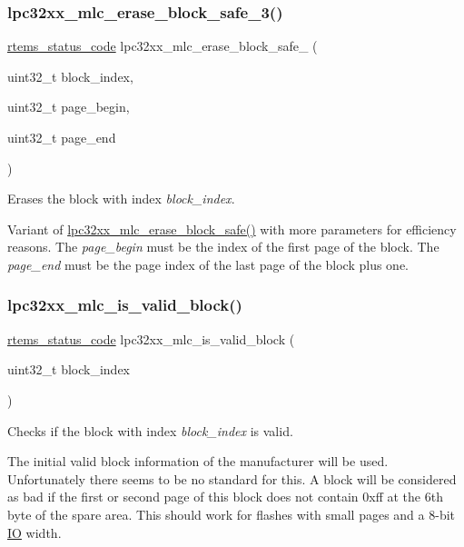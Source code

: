\subsubsection{\texorpdfstring{lpc32xx\_mlc\_erase\_block\_safe\_3()}{lpc32xx\_mlc\_erase\_block\_safe\_3()}}
{\footnotesize\ttfamily \mbox{\hyperlink{group__ClassicStatus_ga545d41846817eaba6143d52ee4d9e9fe}{rtems\+\_\+status\+\_\+code}} lpc32xx\+\_\+mlc\+\_\+erase\+\_\+block\+\_\+safe\+\_ (\begin{DoxyParamCaption}\item[{uint32\+\_\+t}]{block\+\_\+index,  }\item[{uint32\+\_\+t}]{page\+\_\+begin,  }\item[{uint32\+\_\+t}]{page\+\_\+end }\end{DoxyParamCaption})}



Erases the block with index {\itshape block\+\_\+index}. 

Variant of \mbox{\hyperlink{group__lpc32xx__nand__mlc_gab3b2378535527c368dd10f78a4eca68c}{lpc32xx\+\_\+mlc\+\_\+erase\+\_\+block\+\_\+safe()}} with more parameters for efficiency reasons. The {\itshape page\+\_\+begin} must be the index of the first page of the block. The {\itshape page\+\_\+end} must be the page index of the last page of the block plus one. \mbox{\label{group__lpc32xx__nand__mlc_gad2e1dff4507a4ba350d817a1493cad5f}} 
\subsubsection{\texorpdfstring{lpc32xx\_mlc\_is\_valid\_block()}{lpc32xx\_mlc\_is\_valid\_block()}}
{\footnotesize\ttfamily \mbox{\hyperlink{group__ClassicStatus_ga545d41846817eaba6143d52ee4d9e9fe}{rtems\+\_\+status\+\_\+code}} lpc32xx\+\_\+mlc\+\_\+is\+\_\+valid\+\_\+block (\begin{DoxyParamCaption}\item[{uint32\+\_\+t}]{block\+\_\+index }\end{DoxyParamCaption})}



Checks if the block with index {\itshape block\+\_\+index} is valid. 

The initial valid block information of the manufacturer will be used. Unfortunately there seems to be no standard for this. A block will be considered as bad if the first or second page of this block does not contain 0xff at the 6th byte of the spare area. This should work for flashes with small pages and a 8-\/bit \mbox{\hyperlink{structIO}{IO}} width.


